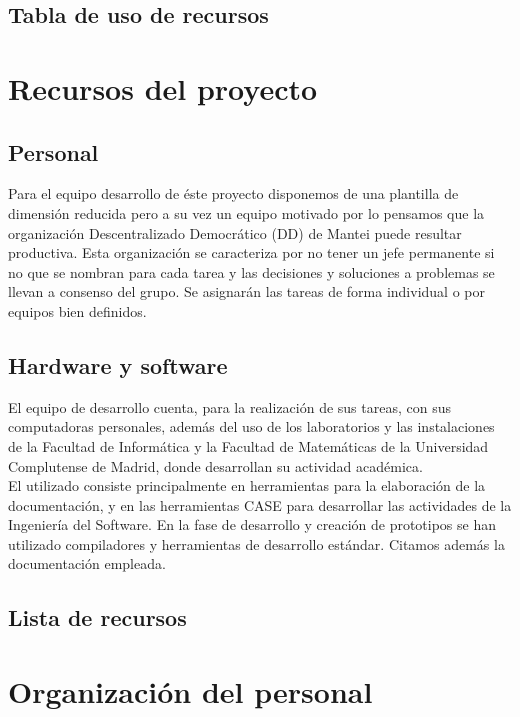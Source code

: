 \documentclass[11pt, a4paper, twoside, titlepage]{article}
\begin{document}
		\subsection{Tabla de uso de recursos} %
	\section{Recursos del proyecto}
		\subsection{Personal}
			Para el equipo desarrollo de éste proyecto disponemos de una plantilla de dimensión reducida pero a su vez un equipo motivado por lo pensamos que la organización Descentralizado Democrático (DD) de Mantei puede resultar productiva. Esta organización se caracteriza por no tener un jefe permanente si no que se nombran para cada tarea y las decisiones y soluciones a problemas se llevan a consenso del grupo. Se asignarán las tareas de forma individual o por equipos bien definidos.

		\subsection{Hardware y software}
			El equipo de desarrollo cuenta, para la realización de sus tareas, con sus computadoras personales, además del uso de los laboratorios y las instalaciones de la Facultad de Informática y la Facultad de Matemáticas de la Universidad Complutense de Madrid, donde desarrollan su actividad académica.\\

			El \software utilizado consiste principalmente en herramientas para la elaboración de la documentación, y en las herramientas CASE para desarrollar las actividades de la Ingeniería del Software. En la fase de desarrollo y creación de prototipos se han utilizado compiladores y herramientas de desarrollo estándar. Citamos además la documentación empleada.

		\subsection{Lista de recursos}
			

	\section{Organización del personal}
\end{document}

